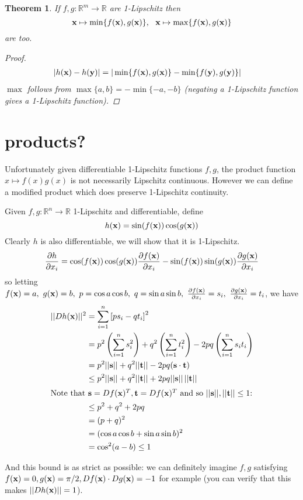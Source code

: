 \documentclass{article}
\newcommand\bb\mathbb
\renewcommand\vec\textbf
\renewcommand\l\left
\renewcommand\r\right
\newtheorem{theorem}{Theorem}
\newcommand\pp[2]{\frac{\partial #1}{\partial #2}}
\begin{document}
\begin{theorem}
\label{minmax}
If $f,g:\bb R^m\to\bb R$ are 1-Lipschitz then
$$\vec x\mapsto \min\{f(\vec x),g(\vec x)\},~~\vec x\mapsto \max\{f(\vec x),g(\vec x)\}$$
are too.
\begin{proof}
\begin{align*}
|h(\vec x)-h(\vec y)| &= | \min\{f(\vec x),g(\vec x)\} - \min\{f(\vec y),g(\vec y)\}|
\end{align*}
$\max$ follows from $\max\{a,b\} = -\min\{-a,-b\}$ (negating a 1-Lipschitz function gives
a 1-Lipschitz function).
\end{proof}
\end{theorem}


\section{products?}
Unfortunately given differentiable 1-Lipschitz functions $f,g$, the product function $x\mapsto f(x)g(x)$
is not necessarily Lipschitz continuous. However we can define a modified product which does
preserve 1-Lipschitz continuity.

Given $f,g:\bb R^n \to \bb R$ 1-Lipschitz and differentiable, define
$$h(\vec x) = \sin (f(\vec x))\cos(g(\vec x))$$
Clearly $h$ is also differentiable, we will show that it is 1-Lipschitz.
$$\pp h{x_i} = \cos(f(\vec x))\cos(g(\vec x)) \pp{f(\vec x)}{x_i}- \sin(f(\vec x))\sin(g(\vec x))  \pp{g(\vec x)}{x_i}$$
so letting $f(\vec x) = a,~g(\vec x)= b,~p = \cos a\cos b,~q = \sin a\sin b,~\pp{f(\vec x)}{x_i} = s_i,~\pp{g(\vec x)}{x_i} = t_i$, we have
\begin{align*}
||Dh(\vec x)||^2 &= \sum_{i=1}^n \left[ps_i - qt_i\right]^2\\
&=p^2\l(\sum_{i=1}^n  s_i^2\r) +  q^2\l(\sum_{i=1}^n  t_i^2\r)- 2pq\l(\sum_{i=1}^n s_it_i\r)\\
&=p^2||\vec s|| + q^2||\vec t||- 2pq(\vec s\cdot \vec t)\\
&\leq p^2||\vec s|| + q^2||\vec t||+ 2pq||\vec s||\,||\vec t||\\
\intertext{Note that $\vec s = Df(\vec x)^T,\vec t=Df(\vec x)^T$ and so $||\vec s||,||\vec t|| \leq 1$:}
&\leq p^2 + q^2 + 2pq\\
&= (p+q)^2\\
&= (\cos a\cos b + \sin a\sin b)^2\\
&= \cos^2(a-b) \leq 1
\end{align*}

And this bound is as strict as possible: we can definitely imagine $f,g$ satisfying
$f(\vec x) = 0,g(\vec x)=\pi/2, Df(\vec x)\cdot Dg(\vec x) = -1$ for example (you can verify that this
makes $||Dh(\vec x)|| = 1$).
\end{document}
